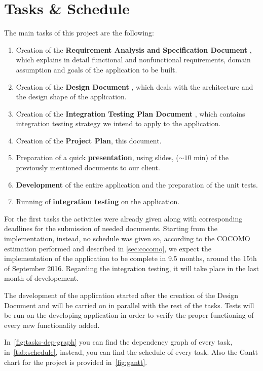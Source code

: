 \section{Tasks \& Schedule}

The main tasks of this project are the following:
\begin{enumerate}
    \item Creation of the \textbf{Requirement Analysis and Specification Document} \cite{bib:rasd}, which explains in detail functional and nonfunctional requirements, domain assumption and goals of the application to be built.
    \item Creation of the \textbf{Design Document} \cite{bib:dd}, which deals with the architecture and the design shape of the application.
    \item Creation of the \textbf{Integration Testing Plan Document} \cite{bib:itpd}, which contains integration testing strategy we intend to apply to the application.
    \item Creation of the \textbf{Project Plan}, this document.
    \item Preparation of a quick \textbf{presentation}, using slides, ($\sim 10$ min) of the previously mentioned documents to our client.
    \item \textbf{Development} of the entire application and the preparation of the unit tests.
    \item Running of \textbf{integration testing} on the application.
\end{enumerate}

For the first tasks the activities were already given along with corresponding deadlines for the submission of needed documents. Starting from the implementation, instead, no schedule was given so, according to the COCOMO estimation performed and described in \ref{sec:cocomo}, we expect the implementation of the application to be complete in 9.5 months, around the 15th of September 2016.
Regarding the integration testing, it will take place in the last month of developement.

The development of the application started after the creation of the Design Document and will be carried on in parallel with the rest of the tasks.
Tests will be run on the developing application in order to verify the proper functioning of every new functionality added.

In~\autoref{fig:tasks-dep-graph} you can find the dependency graph of every task, in~\autoref{tab:schedule}, instead, you can find the schedule of every task. Also the Gantt chart for the project is provided in~\autoref{fig:gantt}.


